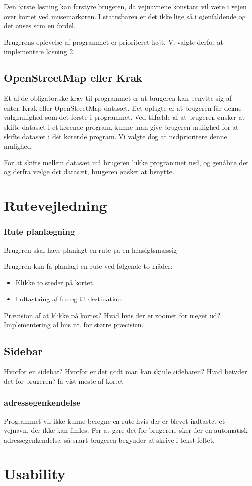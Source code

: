Den første løsning kan forstyre brugeren, da vejnavnene konstant vil være i vejen over kortet ved musemarkøren. I statusbaren er det ikke lige så i øjenfaldende og det anses som en fordel. 

Brugerens oplevelse af programmet er prioriteret højt. Vi valgte derfor at implementere løsning 2.


\subsection{OpenStreetMap eller Krak}
Et af de obligatoriske krav til programmet er at brugeren kan benytte sig af enten Krak eller OpenStreetMap datasæt. Det oplagte er at brugeren får denne valgmulighed som det første i programmet. Ved tilfælde af at brugeren ønsker at skifte datasæt i et kørende program, kunne man give brugeren mulighed for at skifte datasæt i det kørende program. Vi valgte dog at nedprioritere denne mulighed.

For at skifte mellem datasæt må brugeren lukke programmet ned, og genåbne det og derfra vælge det datasæt, brugeren ønsker at benytte. 


\section{Rutevejledning}

\subsubsection{Rute planlægning}

Brugeren skal have planlagt en rute på en hensigtsmæssig

Brugeren kan få planlagt en rute ved følgende to måder:

\begin{itemize}
	\item Klikke to steder på kortet.
	\item  Indtastning af fra og til destination.
\end{itemize}

Præcision af at klikke på kortet? Hvad hvis der er zoomet for meget ud?
Implementering af hus nr. for større præcision. 

\subsection{Sidebar}


Hvorfor en sidebar?
Hvorfor er det godt man kan skjule sidebaren?
Hvad betyder det for brugeren? få vist meste af kortet

\subsubsection{adressegenkendelse}
Programmet vil ikke kunne beregne en rute hvis der er blevet indtastet et vejnavn, der ikke kan findes. For at gøre det for brugeren, sker der en automatisk adressegenkendelse, så snart brugeren begynder at skrive i tekst feltet. 

\section{Usability}
